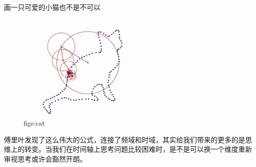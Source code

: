 \documentclass[lang=cn,11pt,a4paper,cite=numbers]{elegantpaper}
\begin{document}
  画一只可爱的小猫也不是不可以~
\begin{figure}[!htb]
  \centering
  \includegraphics[width=0.6\textwidth]{figs/cat.png}
  \caption{figs:cat}
  \label{figs:cat}
\end{figure}

  傅里叶发现了这么伟大的公式，连接了频域和时域，其实给我们带来的更多的是思维上的转变。当我们在时间轴上思考问题比较困难时，是不是可以换一个维度重新审视思考或许会豁然开朗。

\nocite{*}

\end{document}
